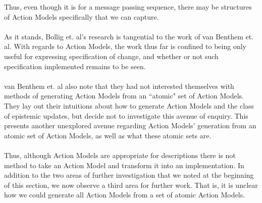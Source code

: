 \documentclass[12pt, a4paper, twoside]{article}
\begin{document}
Thus, even though it is for a message passing sequence, there may be
structures of Action Models specifically that we can capture.\\
\\
As it stands, Bollig et. al's research is tangential to the work of van Benthem
et. al.
With regards to Action Models, the work thus far is confined to being only
useful for expressing specification of change, and whether or not such
specification implemented remains to be seen.\\
\\
van Benthem et. al also note that they had not interested themselves with methods of
generating Action Models from an ``atomic" set of Action Models. \citep{benthem2006lcc}
They lay out their intuitions about how to generate Action Models and the class
of epistemic updates, but decide not to investigate this avenue of enquiry.
This presents another unexplored avenue regarding Action Models' generation from
an atomic set of Action Models, as well as what these atomic sets are.\\
\\
Thus, although Action Models are appropriate for descriptions there is not
method to take an Action Model and transform it into an implementation.
In addition to the two areas of further investigation that we noted at the
beginning of this section, we now observe a third area for further work.
That is, it is unclear how we could generate all Action Models from a
set of atomic Action Models.
\end{document}
